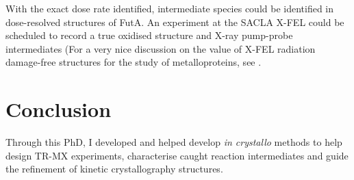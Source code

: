 With the exact dose rate identified, intermediate species could be identified in dose-resolved structures of FutA. An experiment at the SACLA X-FEL could be scheduled to record a true oxidised structure and X-ray pump-probe intermediates (For a very nice discussion on the value of X-FEL radiation damage-free structures for the study of metalloproteins, see \cite{moreno-chicanoComplementarityNeutronXFEL2022}. 

\section{Conclusion}

Through this PhD, I developed and helped develop \textit{in crystallo} methods to help design TR-MX experiments, characterise caught reaction intermediates and guide the refinement of kinetic crystallography structures. 